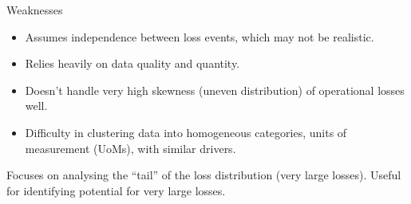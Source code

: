 \begin{ornotebox}{Weaknesses}
\begin{itemize}
\item Assumes independence between loss events, which may not be realistic.
\item Relies heavily on data quality and quantity.
\item Doesn't handle very high skewness (uneven distribution) of operational
losses well.
\item Difficulty in clustering data into homogeneous categories, units of
measurement (UoMs), with similar drivers.
\end{itemize}
\end{ornotebox}


Focuses on analysing the ``tail'' of the loss distribution (very large losses).
Useful for identifying potential for very large losses.

